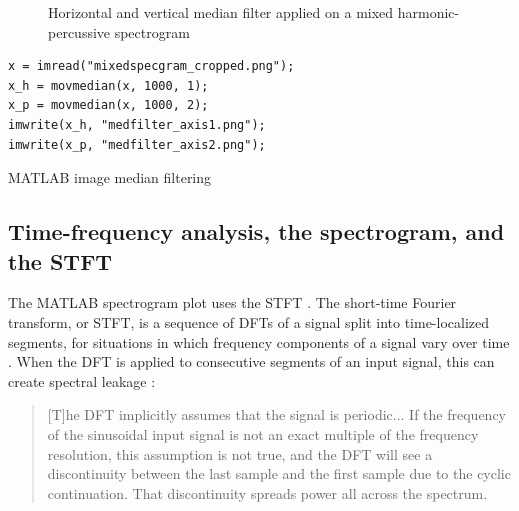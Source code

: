 \documentclass[letter,12pt]{article}
\begin{document}
\begin{figure}[ht]
	\hspace{0.4em}
	\caption{Horizontal and vertical median filter applied on a mixed harmonic-percussive spectrogram}
	\label{fig:mixspec}%
\end{figure}

\begin{listing}[h]
\setlength\partopsep{-\topsep}
\begin{verbatim}
x = imread("mixedspecgram_cropped.png");
x_h = movmedian(x, 1000, 1);
x_p = movmedian(x, 1000, 2);
imwrite(x_h, "medfilter_axis1.png");
imwrite(x_p, "medfilter_axis2.png");
\end{verbatim}
\caption{MATLAB image median filtering}
\label{code:medfilterim}
\end{listing}

\vfill
\clearpage %

\subsection{Time-frequency analysis, the spectrogram, and the STFT}

The MATLAB spectrogram plot uses the STFT \cite{specstft}. The short-time Fourier transform, or STFT, is a sequence of DFTs of a signal split into time-localized segments, for situations in which frequency components of a signal vary over time \cite{timefreq}. When the DFT is applied to consecutive segments of an input signal, this can create spectral leakage \cite{whyoverlap}:

\begin{quote}
	[T]he DFT implicitly assumes that the signal is periodic... If the frequency of the sinusoidal input signal is not an exact multiple of the frequency resolution, this assumption is not true, and the DFT will see a discontinuity between the last sample and the first sample due to the cyclic continuation. That discontinuity spreads power all across the spectrum.
\end{quote}
\end{document}
